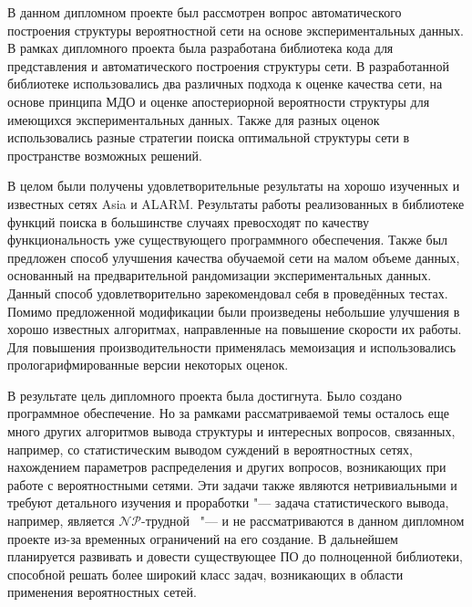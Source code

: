 

В данном дипломном проекте был рассмотрен вопрос автоматического построения структуры вероятностной сети на основе экспериментальных данных.
В рамках дипломного проекта была разработана библиотека кода для представления и автоматического построения структуры сети.
В разработанной библиотеке использовались два различных подхода к оценке качества сети, на основе принципа МДО и оценке апостериорной вероятности структуры для имеющихся экспериментальных данных.
Также для разных оценок использовались разные стратегии поиска оптимальной структуры сети в пространстве возможных решений.

В целом были получены удовлетворительные результаты на хорошо изученных и известных сетях Asia и ALARM.
Результаты работы реализованных в библиотеке функций поиска в большинстве случаях превосходят по качеству функциональность уже существующего программного обеспечения.
Также был предложен способ улучшения качества обучаемой сети на малом объеме данных, основанный на предварительной рандомизации экспериментальных данных.
Данный способ удовлетворительно зарекомендовал себя в проведённых тестах.
Помимо предложенной модификации были произведены небольшие улучшения в хорошо известных алгоритмах, направленные на повышение скорости их работы.
Для повышения производительности применялась мемоизация и использовались прологарифмированные версии некоторых оценок.

В результате цель дипломного проекта была достигнута.
Было создано программное обеспечение.
Но за рамками рассматриваемой темы осталось еще много других алгоритмов вывода структуры и интересных вопросов, связанных, например, со статистическим выводом суждений в вероятностных сетях, нахождением параметров распределения и других вопросов, возникающих при работе с вероятностными сетями.
Эти задачи также являются нетривиальными и требуют детального изучения и проработки "--- задача статистического вывода, например, является $\mathcal{NP}$-трудной~\cite{Koller_2009} "--- и не рассматриваются в данном дипломном проекте из-за временных ограничений на его создание.
В дальнейшем планируется развивать и довести существующее ПО до полноценной библиотеки, способной решать более широкий класс задач, возникающих в области применения вероятностных сетей.
